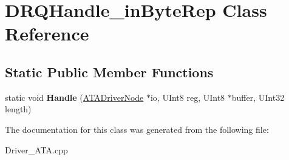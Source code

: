 \hypertarget{class_d_r_q_handle__in_byte_rep}{}\section{D\+R\+Q\+Handle\+\_\+in\+Byte\+Rep Class Reference}
\label{class_d_r_q_handle__in_byte_rep}
\subsection*{Static Public Member Functions}
\begin{DoxyCompactItemize}
\item 
\mbox{\label{class_d_r_q_handle__in_byte_rep_aa7ff48a9c2278f27f3aa67e71e146ef7}} 
static void {\bfseries Handle} (\hyperlink{class_a_t_a_driver_node}{A\+T\+A\+Driver\+Node} $\ast$io, U\+Int8 reg, U\+Int8 $\ast$buffer, U\+Int32 length)
\end{DoxyCompactItemize}


The documentation for this class was generated from the following file\+:\begin{DoxyCompactItemize}
\item 
Driver\+\_\+\+A\+T\+A.\+cpp\end{DoxyCompactItemize}
